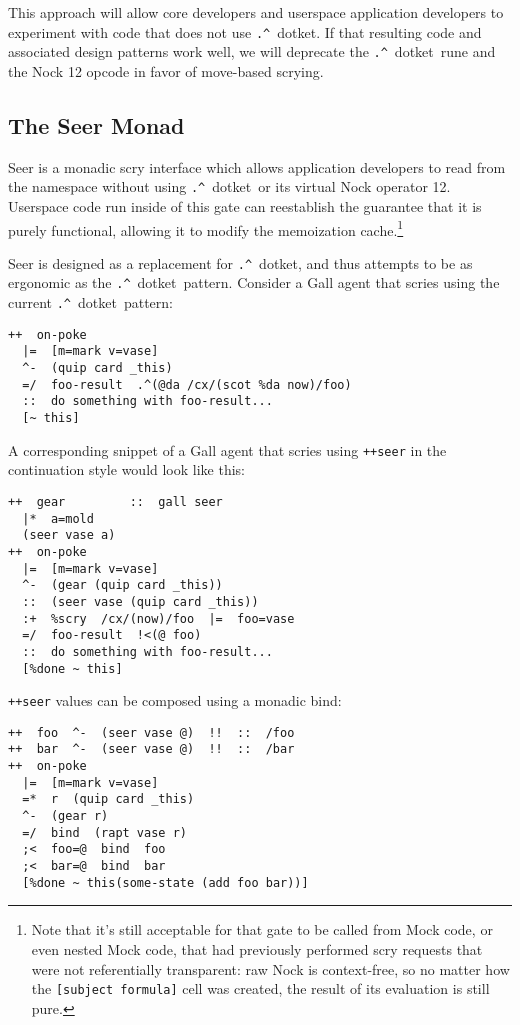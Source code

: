 \documentclass[twoside]{article}
\newcommand{\dotket}{\lstinline[style=inlinecode]{.^}~dotket}
\begin{document}
This approach will allow core developers and userspace application developers to experiment with code that does not use \dotket.  If that resulting code and associated design patterns work well, we will deprecate the \dotket~rune and the Nock 12 opcode in favor of move-based scrying.

\subsection{The Seer Monad}

Seer is a monadic scry interface which allows application developers to read from the namespace without using \dotket~or its virtual Nock operator 12.  Userspace code run inside of this gate can reestablish the guarantee that it is purely functional, allowing it to modify the memoization cache.\footnote{Note that it's still acceptable for that gate to be called from Mock code, or even nested Mock code, that had previously performed scry requests that were not referentially transparent:  raw Nock is context-free, so no matter how the \lstinline[style=inlinecode]{[subject formula]} cell was created, the result of its evaluation is still pure.}

Seer is designed as a replacement for \dotket, and thus attempts to be as ergonomic as the \dotket~pattern.  Consider a Gall agent that scries using the current \dotket~pattern:

\begin{lstlisting}[style=listingcode]
++  on-poke
  |=  [m=mark v=vase]
  ^-  (quip card _this)
  =/  foo-result  .^(@da /cx/(scot %da now)/foo)
  ::  do something with foo-result...
  [~ this]
\end{lstlisting}

A corresponding snippet of a Gall agent that scries using \lstinline[style=inlinecode]{++seer} in the continuation style would look like this:

\begin{lstlisting}[style=listingcode]
++  gear         ::  gall seer
  |*  a=mold
  (seer vase a)
++  on-poke
  |=  [m=mark v=vase]
  ^-  (gear (quip card _this))
  ::  (seer vase (quip card _this))
  :+  %scry  /cx/(now)/foo  |=  foo=vase
  =/  foo-result  !<(@ foo)
  ::  do something with foo-result...
  [%done ~ this]
\end{lstlisting}

\lstinline[style=inlinecode]{++seer} values can be composed using a monadic bind:

\begin{lstlisting}[style=listingcode]
++  foo  ^-  (seer vase @)  !!  ::  /foo
++  bar  ^-  (seer vase @)  !!  ::  /bar
++  on-poke
  |=  [m=mark v=vase]
  =*  r  (quip card _this)
  ^-  (gear r)
  =/  bind  (rapt vase r)
  ;<  foo=@  bind  foo
  ;<  bar=@  bind  bar
  [%done ~ this(some-state (add foo bar))]
\end{lstlisting}
\end{document}
